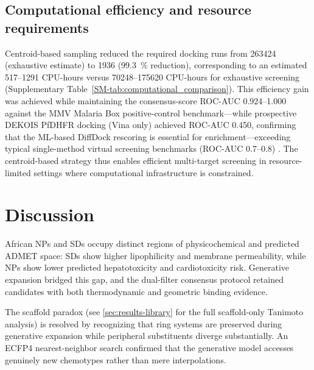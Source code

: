 \documentclass[journal=jcisd8,manuscript=article]{achemso}
\begin{document}
\subsection{Computational efficiency and resource requirements}
\label{sec:computational_efficiency}

Centroid-based sampling reduced the required docking runs from \num{263424} (exhaustive estimate) to \num{1936} (\qty{99.3}{\percent} reduction), corresponding to an estimated \numrange{517}{1291} CPU-hours versus \numrange{70248}{175620} CPU-hours for exhaustive screening (Supplementary Table~\ref{SM-tab:computational_comparison}). This efficiency gain was achieved while maintaining the consensus-score ROC-AUC \numrange{0.924}{1.000} against the MMV Malaria Box positive-control benchmark---while prospective DEKOIS PfDHFR docking (Vina only) achieved ROC-AUC \num{0.450}, confirming that the ML-based DiffDock rescoring is essential for enrichment---exceeding typical single-method virtual screening benchmarks (ROC-AUC \numrange{0.7}{0.8}) \cite{Truchon2007}. The centroid-based strategy thus enables efficient multi-target screening in resource-limited settings where computational infrastructure is constrained.

\section{Discussion}

African NPs and SDs occupy distinct regions of physicochemical and predicted ADMET space: SDs show higher lipophilicity and membrane permeability, while NPs show lower predicted hepatotoxicity and cardiotoxicity risk. Generative expansion bridged this gap, and the dual-filter consensus protocol retained candidates with both thermodynamic and geometric binding evidence.

The scaffold paradox (see \cref{sec:results-library} for the full scaffold-only Tanimoto analysis) is resolved by recognizing that ring systems are preserved during generative expansion while peripheral substituents diverge substantially. An ECFP4 nearest-neighbor search confirmed that the generative model accesses genuinely new chemotypes rather than mere interpolations.
\end{document}
